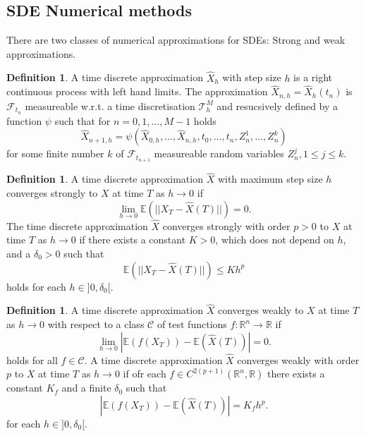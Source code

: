 \documentclass[12pt]{article}
\theoremstyle{definition}
\newtheorem{definition}[theorem]{Definition}
\numberwithin{equation}{section}
\begin{document}
\subsection{SDE Numerical methods}
\label{subsec:SdeNumericalMethods}
There are two classes of numerical approximations for SDEs: Strong and weak approximations. 
\begin{definition}
  A time discrete approximation $\hat{X}_h$ with step size $h$ is a right continuous process with left hand limits. The approximation $\hat{X}_{n,h} = \hat{X}_h(t_n)$ is $\mathcal{F}_{t_n}$ measureable w.r.t. a time discretisation $\mathcal{T}^M_h$ and resucsively defined by a function $\psi$ such that for $n=0,1,\dots,M-1$ holds
  \begin{equation}
    \hat{X}_{n+1, h} = \psi(\hat{X}_{0,h}, \dots, \hat{X}_{n,h}, t_0, \dots, t_n, Z^1_n,\dots, Z_n^k)
  \end{equation}
  for some finite number $k$ of $\mathcal{F}_{t_{n+1}}$ measureable random variables $Z^j_n, 1 \leq j \leq k$.
\end{definition}
\begin{definition}
  A time discrete approximation $\hat{X}$ with maximum step size $h$ converges strongly to $X$ at time $T$ as $h \rightarrow 0$ if 
  \begin{equation}
    \lim_{h \rightarrow 0} \mathbb{E}(||X_T - \hat{X}(T)||) = 0.
  \end{equation}
  The time discrete approximation $\hat{X}$ converges strongly with order $p>0$ to $X$ at time $T$ as $h \rightarrow 0$ if there exists a constant $K > 0$, which does not depend on $h$, and a $\delta_0 > 0$ such that 
  \begin{equation}
    \mathbb{E}(||X_T - \hat{X}(T)||) \leq K h^p
  \end{equation}
  holds for each $h \in ]0, \delta_0[$.
\end{definition}

\begin{definition}
  A time discrete approximation $\hat{X}$ converges weakly to $X$ at time $T$ as $h \rightarrow 0$ with respect to a class $\mathcal{C}$ of test functions $f: \mathbb{R}^n \rightarrow \mathbb{R}$ if 
  \begin{equation}
    \lim_{h \rightarrow 0} |\mathbb{E}(f(X_T)) - \mathbb{E}(\hat{X}(T))| = 0.
  \end{equation}
  holds for all $f \in \mathcal{C}$.
  A time discrete approximation $\hat{X}$ converges weakly with order $p$ to $X$ at time $T$ as $h \rightarrow 0$ if ofr each $f \in C^{2(p+1)}(\mathbb{R}^n, \mathbb{R})$ there exists a constant $K_f$ and a finite $\delta_0$ such that 
  \begin{equation}
     |\mathbb{E}(f(X_T)) - \mathbb{E}(\hat{X}(T))| = K_f h^p.
  \end{equation}
  for each $h \in ]0, \delta_0[$.
\end{definition}
\end{document}
